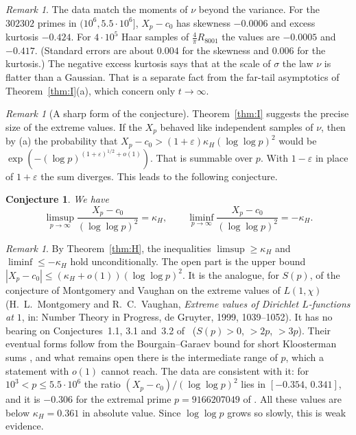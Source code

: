 \documentclass[11pt]{amsart}
\newtheorem{conjecture}[theorem]{Conjecture}
\theoremstyle{remark}
\newtheorem{remark}[lemma]{Remark}
\begin{document}
\begin{remark}
The data match the moments of $\nu$ beyond the variance. For the $302302$ primes in $(10^6,5.5\cdot10^6]$, $X_p-c_0$ has skewness $-0.0006$ and excess kurtosis $-0.424$. For $4\cdot10^5$ Haar samples of $\frac4\pi R_{8001}$ the values are $-0.0005$ and $-0.417$. (Standard errors are about $0.004$ for the skewness and $0.006$ for the kurtosis.) The negative excess kurtosis says that at the scale of $\sigma$ the law $\nu$ is flatter than a Gaussian. That is a separate fact from the far-tail asymptotics of Theorem~\ref{thm:I}(a), which concern only $t\to\infty$.
\end{remark}

\begin{remark}[A sharp form of the conjecture]\label{rem:conj}
Theorem~\ref{thm:I} suggests the precise size of the extreme values. If the $X_p$ behaved like independent samples of $\nu$, then by (a) the probability that $X_p-c_0>(1+\varepsilon)\kappa_H(\log\log p)^2$ would be $\exp(-(\log p)^{(1+\varepsilon)^{1/2}+o(1)})$. That is summable over $p$. With $1-\varepsilon$ in place of $1+\varepsilon$ the sum diverges. This leads to the following conjecture.\end{remark}

\begin{conjecture}\label{conj}
We have
\[
\limsup_{p\to\infty}\frac{X_p-c_0}{(\log\log p)^2}=\kappa_H,\qquad\liminf_{p\to\infty}\frac{X_p-c_0}{(\log\log p)^2}=-\kappa_H .
\]
\end{conjecture}

\begin{remark}
By Theorem~\ref{thm:H}, the inequalities $\limsup\ge\kappa_H$ and $\liminf\le-\kappa_H$ hold unconditionally. The open part is the upper bound $|X_p-c_0|\le(\kappa_H+o(1))(\log\log p)^2$. It is the analogue, for $S(p)$, of the conjecture of Montgomery and Vaughan on the extreme values of $L(1,\chi)$ (H.~L.~Montgomery and R.~C.~Vaughan, \emph{Extreme values of Dirichlet $L$-functions at $1$}, in: Number Theory in Progress, de Gruyter, 1999, 1039--1052). It has no bearing on Conjectures~1.1, 3.1 and~3.2 of~\cite{BBMXZ} ($S(p)>0$, $>2p$, $>3p$). Their eventual forms follow from the Bourgain--Garaev bound for short Kloosterman sums \cite{TS}, and what remains open there is the intermediate range of $p$, which a statement with $o(1)$ cannot reach. The data are consistent with it: for $10^3<p\le5.5\cdot10^6$ the ratio $(X_p-c_0)/(\log\log p)^2$ lies in $[-0.354,\,0.341]$, and it is $-0.306$ for the extremal prime $p=9166207049$ of \cite[Table~4]{TS}. All these values are below $\kappa_H=0.361$ in absolute value. Since $\log\log p$ grows so slowly, this is weak evidence.
\end{remark}
\end{document}
